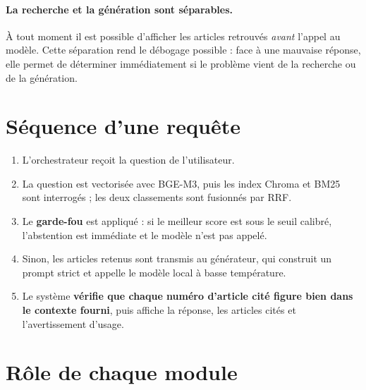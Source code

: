 \paragraph{La recherche et la génération sont séparables.}
À tout moment il est possible d'afficher les articles retrouvés \emph{avant} l'appel au modèle.
Cette séparation rend le débogage possible : face à une mauvaise réponse, elle permet de
déterminer immédiatement si le problème vient de la recherche ou de la génération.

\section{Séquence d'une requête}

\begin{enumerate}
    \item L'orchestrateur reçoit la question de l'utilisateur.
    \item La question est vectorisée avec BGE-M3, puis les index Chroma et BM25 sont interrogés ;
    les deux classements sont fusionnés par RRF.
    \item Le \textbf{garde-fou} est appliqué : si le meilleur score est sous le seuil calibré,
    l'abstention est immédiate et le modèle n'est pas appelé.
    \item Sinon, les articles retenus sont transmis au générateur, qui construit un prompt
    strict et appelle le modèle local à basse température.
    \item Le système \textbf{vérifie que chaque numéro d'article cité figure bien dans le
    contexte fourni}, puis affiche la réponse, les articles cités et l'avertissement d'usage.
\end{enumerate}

\section{Rôle de chaque module}

